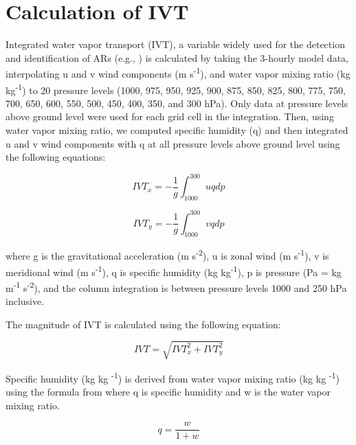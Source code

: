 \documentclass[draft]{agujournal2019}
\begin{document}
\section{Calculation of IVT}    %
\label{appendix:ivt}
Integrated water vapor transport (IVT), a variable widely used for the detection and identification of ARs (e.g., ) is calculated by taking the 3-hourly model data, interpolating u and v wind components (m s\textsuperscript{-1}), and water vapor mixing ratio (kg kg\textsuperscript{-1}) to 20 pressure levels (1000, 975, 950, 925, 900, 875, 850, 825, 800, 775, 750, 700, 650, 600, 550, 500, 450, 400, 350, and 300 hPa). Only data at pressure levels above ground level were used for each grid cell in the integration. Then, using water vapor mixing ratio, we computed specific humidity (q) and then integrated u and v wind components with q at all pressure levels above ground level using the following equations:

\begin{equation}
IVT_{x} = -\frac{1}{g} \int_{1000}^{300} u q dp
\end{equation}

\begin{equation}
IVT_{y} = -\frac{1}{g} \int_{1000}^{300} v q dp
\end{equation}

where g is the gravitational acceleration (m s\textsuperscript{-2}), u is zonal wind (m s\textsuperscript{-1}), v is meridional wind (m s\textsuperscript{-1}), q is specific humidity (kg kg\textsuperscript{-1}), p is pressure (Pa = kg m\textsuperscript{-1} s\textsuperscript{-2}), and the column integration is between pressure levels 1000 and 250 hPa inclusive.

The magnitude of IVT is calculated using the following equation:

\begin{equation}
IVT = \sqrt{IVT_{x}^2 + IVT_{y}^2}
\end{equation}

Specific humidity (kg kg \textsuperscript{-1}) is derived from water vapor mixing ratio (kg kg \textsuperscript{-1}) using the formula from \cite{Wallace2006} where q is specific humidity and w is the water vapor mixing ratio.

\begin{equation}
q = \frac{w}{1 + w}
\end{equation}

\end{document}
